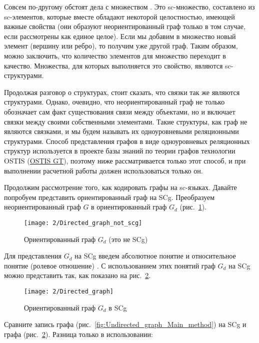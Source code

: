 Совсем по-другому обстоят дела с множеством . Это
sc-множество, составлено из sc-элементов, которые вместе обладают
некоторой целостностью, имеющей важные свойства (они образуют
неориентированный граф только в том случае, если рассмотрены как
единое целое). Если мы добавим в множество  новый
элемент (вершину или ребро), то получим уже другой граф. Таким образом,
можно заключить, что количество элементов для множество 
переходит в качество. Множества, для которых выполняется это свойство,
являются sc-структурами.

Продолжая разговор о структурах, стоит сказать, что связки так же
являются структурами. Однако, очевидно, что неориентированный граф
 не только обозначает сам факт существования связи между
объектами, но и включает связки между своими собственными
элементами. Такие структуры, как граф  не являются связками, и
мы будем называть их одноуровневыми реляционными структурами.  Способ
представления графов в виде одноуровневых реляционных структур
используется в проекте базы знаний по теории графов технологии OSTIS
(\href{http://ostisgraphstheo.sourceforge.net}{OSTIS GT}), поэтому
ниже рассматривается только этот способ, и при выполнении расчетной
работы должен использоваться только он.

Продолжим рассмотрение того, как кодировать графы на sc-языках.
Давайте попробуем представить ориентированный граф на SCg. Преобразуем
неориентированный граф $G$ в ориентированный граф $G_d$
(рис.~\ref{fig:Directed_graph_not_scg}).

\begin{figure}[h!]
  \centering
  \texttt{[image: 2/Directed\_graph\_not\_scg]}
  \caption{Ориентированный граф $G_d$ (это не SCg)}
  \label{fig:Directed_graph_not_scg}
\end{figure}

Для представления $G_d$ на SCg введем абсолютное понятие
 и относительное понятие (ролевое
отношение) . С использованием этих понятий граф $G_d$ на
SCg можно представить так, как показано на
рис.~\ref{fig:Directed_graph}.

\begin{figure}[h]
  \centering
  \texttt{[image: 2/Directed\_graph]}
  \caption{Ориентированный граф $G_d$ в SCg}
  \label{fig:Directed_graph}
\end{figure}

Сравните запись графа 
(рис.~\ref{fig:Undirected_graph_Main_method}) на SCg и графа
 (рис.~\ref{fig:Directed_graph}). Разница только в
использовании:

